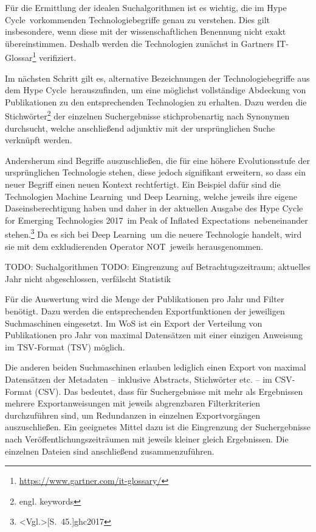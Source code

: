 Für die Ermittlung der idealen Suchalgorithmen ist es wichtig, die im \glqq Hype Cycle\grqq~vorkommenden Technologiebegriffe genau zu verstehen. Dies gilt insbesondere, wenn diese mit der wissenschaftlichen Benennung nicht exakt übereinstimmen. Deshalb werden die Technologien zunächst in Gartners IT-Glossar\footnote{\url{https://www.gartner.com/it-glossary/}} verifiziert.

Im nächsten Schritt gilt es, alternative Bezeichnungen der Technologiebegriffe aus dem \glqq Hype Cycle\grqq~herauszufinden, um eine möglichst vollständige Abdeckung von Publikationen zu den entsprechenden Technologien zu erhalten. Dazu werden die Stichwörter\footnote{engl. keywords} der einzelnen Suchergebnisse stichprobenartig nach Synonymen durchsucht, welche anschließend adjunktiv mit der ursprünglichen Suche verknüpft werden.

Andersherum sind Begriffe auszuschließen, die für eine höhere Evolutionsstufe der ursprünglichen Technologie stehen, diese jedoch signifikant erweitern, so dass ein neuer Begriff einen neuen Kontext rechtfertigt. Ein Beispiel dafür sind die Technologien \glqq Machine Learning\grqq~und \glqq Deep Learning\grqq, welche jeweils ihre eigene Daseinsberechtigung haben und daher in der aktuellen Ausgabe des \glqq Hype Cycle for Emerging Technologies 2017\grqq~im \glqq Peak of Inflated Expectations\grqq~nebeneinander stehen.\footnote{\citeNP<Vgl.>[S.~45.]{ghc2017}} Da es sich bei \glqq Deep Learning\grqq~um die neuere Technologie handelt, wird sie mit dem exkludierenden Operator \glqq NOT\grqq~jeweils herausgenommen.

TODO: Suchalgorithmen
TODO: Eingrenzung auf Betrachtugszeitraum; aktuelles Jahr nicht abgeschlossen, verfälscht Statistik

Für die Auswertung wird die Menge der Publikationen pro Jahr und Filter benötigt. Dazu werden die entsprechenden Exportfunktionen der jeweiligen Suchmaschinen eingesetzt. Im \ac{WoS} ist ein Export der Verteilung von Publikationen pro Jahr von maximal  Datensätzen mit einer einzigen Anweisung im \acs{TSV}-Format (\acl{TSV}) möglich.

Die anderen beiden Suchmaschinen erlauben lediglich einen Export von maximal  Datensätzen der Metadaten -- inklusive Abstracts, Stichwörter etc. -- im \acs{CSV}-Format (\acl{CSV}). Das bedeutet, dass für Suchergebnisse mit mehr als  Ergebnissen mehrere Exportanweisungen mit jeweils abgrenzbaren Filterkriterien durchzuführen sind, um Redundanzen in einzelnen Exportvorgängen auszuschließen. Ein geeignetes Mittel dazu ist die Eingrenzung der Suchergebnisse nach Veröffentlichungs\-zeiträumen mit jeweils kleiner gleich  Ergebnissen. Die einzelnen Dateien sind anschließend zusammenzuführen.

